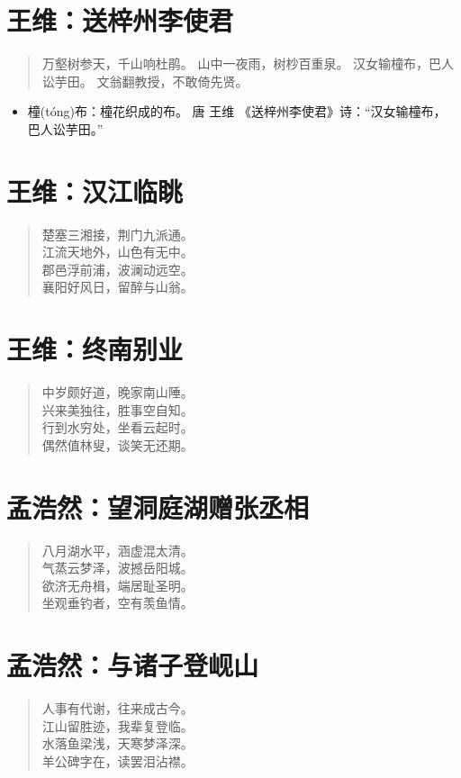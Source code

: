 \documentclass[12pt,oneside]{book}
\newenvironment{shici}{
\begin{verse}
\centering\large\hspace{12pt}}
{\end{verse}}
\begin{document}
\chapter{王维：送梓州李使君}
\begin{shici}
万壑树参天，千山响杜鹃。
山中一夜雨，树杪百重泉。
汉女输橦布，巴人讼芋田。
文翁翻教授，不敢倚先贤。
\end{shici}

\begin{itemize}
\item 橦(tóng)布：橦花织成的布。 唐 王维 《送梓州李使君》诗：“汉女输橦布， 巴人讼芋田。”
\end{itemize}


\chapter{王维：汉江临眺}
\begin{shici}
楚塞三湘接，荆门九派通。\\
江流天地外，山色有无中。\\
郡邑浮前浦，波澜动远空。\\
襄阳好风日，留醉与山翁。
\end{shici}

\chapter{王维：终南别业}
\begin{shici}
中岁颇好道，晚家南山陲。\\
兴来美独往，胜事空自知。\\
行到水穷处，坐看云起时。\\
偶然值林叟，谈笑无还期。
\end{shici}

\chapter{孟浩然：望洞庭湖赠张丞相}
\begin{shici}
八月湖水平，涵虚混太清。\\
气蒸云梦泽，波撼岳阳城。\\
欲济无舟楫，端居耻圣明。\\
坐观垂钓者，空有羡鱼情。
\end{shici}

\chapter{孟浩然：与诸子登岘山}
\begin{shici}
人事有代谢，往来成古今。\\
江山留胜迹，我辈复登临。\\
水落鱼梁浅，天寒梦泽深。\\
羊公碑字在，读罢泪沾襟。
\end{shici}
\end{document}

